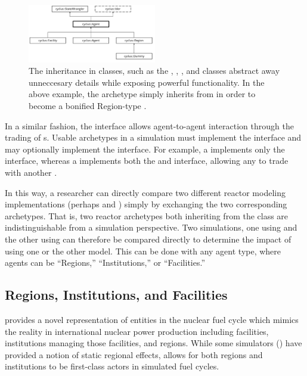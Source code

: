 \begin{figure}[htbp!]
\begin{center}
\includegraphics[width=0.5\textwidth]{./images/agent_uml}
\end{center}
\caption{The inheritance in \Cyclus classes, such as the , 
, , and  classes abstract away 
unneccesary details while exposing powerful functionality. In the above 
example, the  archetype simply inherits from  in 
order to become a bonified Region-type .}
\label{fig:agent_uml}
\end{figure}

In a similar fashion, the  interface allows agent-to-agent interaction through the
trading of s. Usable archetypes in a \Cyclus simulation must
implement the  interface and may optionally implement the
 interface. For example, a  implements only the
 interface, whereas a  implements both the
 and  interface, allowing any  to
trade with another .

In this way, a researcher can directly compare two different reactor modeling 
implementations (perhaps  and ) 
simply by exchanging the two corresponding archetypes. That is, two reactor 
archetypes both inheriting from the  class are indistinguishable 
from a simulation perspective. Two simulations, one using 
 and the other using  can therefore 
be compared directly to determine the impact of using one or the other model.
This can be done with any agent type, where agents can be ``Regions,'' 
``Institutions,'' or ``Facilities.''

\subsection{Regions, Institutions, and Facilities}

\Cyclus provides a novel representation of entities in the nuclear fuel cycle 
which mimics the reality in international nuclear power production
including facilities, institutions managing those facilities, and regions. While
some simulators () have provided a notion of static regional
effects, \Cyclus allows for both regions and institutions to be first-class
actors in simulated fuel cycles.

